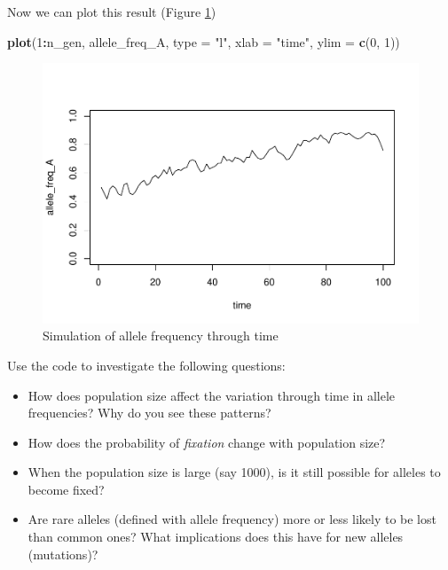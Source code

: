 \documentclass[
  a4paper]{book}
\newenvironment{Shaded}{\begin{snugshade}}{\end{snugshade}}
\newcommand{\AttributeTok}[1]{\textcolor[rgb]{0.13,0.29,0.53}{#1}}
\newcommand{\DecValTok}[1]{\textcolor[rgb]{0.00,0.00,0.81}{#1}}
\newcommand{\FunctionTok}[1]{\textcolor[rgb]{0.13,0.29,0.53}{\textbf{#1}}}
\newcommand{\NormalTok}[1]{#1}
\newcommand{\SpecialCharTok}[1]{\textcolor[rgb]{0.81,0.36,0.00}{\textbf{#1}}}
\newcommand{\StringTok}[1]{\textcolor[rgb]{0.31,0.60,0.02}{#1}}
\providecommand{\tightlist}{%
  \setlength{\itemsep}{0pt}\setlength{\parskip}{0pt}}
\begin{document}
Now we can plot this result (Figure \ref{fig:simulationplot})

\begin{Shaded}
\begin{Highlighting}[]
\FunctionTok{plot}\NormalTok{(}\DecValTok{1}\SpecialCharTok{:}\NormalTok{n\_gen, allele\_freq\_A, }\AttributeTok{type =} \StringTok{"l"}\NormalTok{, }\AttributeTok{xlab =} \StringTok{"time"}\NormalTok{, }\AttributeTok{ylim =} \FunctionTok{c}\NormalTok{(}\DecValTok{0}\NormalTok{, }\DecValTok{1}\NormalTok{))}
\end{Highlighting}
\end{Shaded}

\begin{figure}
\centering
\includegraphics{BB512_files/figure-latex/simulationplot-1.pdf}
\caption{\label{fig:simulationplot}Simulation of allele frequency through time}
\end{figure}

Use the code to investigate the following questions:

\begin{itemize}
\tightlist
\item
  How does population size affect the variation through time in allele frequencies? Why do you see these patterns?
\item
  How does the probability of \emph{fixation} change with population size?
\item
  When the population size is large (say 1000), is it still possible for alleles to become fixed?
\item
  Are rare alleles (defined with allele frequency) more or less likely to be lost than common ones? What implications does this have for new alleles (mutations)?
\end{itemize}
\end{document}
